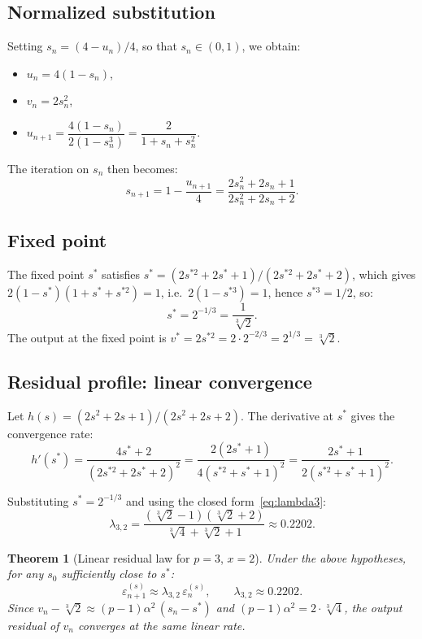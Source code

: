 \documentclass[10pt,a4paper,oneside]{book}
\newtheorem{theorem}{Theorem}[chapter]
\theoremstyle{definition}
\theoremstyle{remark}
\newcommand{\cbrt}[1]{\sqrt[3]{#1}}
\newcommand{\eps}{\varepsilon}
\begin{document}
\subsection{Normalized substitution}

Setting $s_n = (4 - u_n)/4$, so that $s_n \in (0,1)$, we obtain:
\begin{itemize}
  \item $u_n = 4(1 - s_n)$,
  \item $v_n = 2s_n^2$,
  \item $u_{n+1} = \dfrac{4(1-s_n)}{2(1-s_n^3)} = \dfrac{2}{1 + s_n + s_n^2}$.
\end{itemize}

The iteration on $s_n$ then becomes:
\begin{equation}
  \label{eq:iter_s3}
  s_{n+1} = 1 - \frac{u_{n+1}}{4} = \frac{2s_n^2 + 2s_n + 1}{2s_n^2 + 2s_n + 2}.
\end{equation}

\subsection{Fixed point}

The fixed point $s^*$ satisfies $s^* = (2s^{*2} + 2s^* + 1)/(2s^{*2} + 2s^* + 2)$, which gives $2(1-s^*)(1+s^*+s^{*2}) = 1$, i.e.\ $2(1-s^{*3}) = 1$, hence $s^{*3} = 1/2$, so:
\[
  s^* = 2^{-1/3} = \frac{1}{\cbrt{2}}.
\]
The output at the fixed point is $v^* = 2s^{*2} = 2 \cdot 2^{-2/3} = 2^{1/3} = \cbrt{2}$. \checkmark

\subsection{Residual profile: linear convergence}

Let $h(s) = (2s^2 + 2s + 1)/(2s^2 + 2s + 2)$. The derivative at $s^*$ gives the convergence rate:
\[
  h'(s^*) = \frac{4s^* + 2}{(2s^{*2} + 2s^* + 2)^2} = \frac{2(2s^*+1)}{4(s^{*2}+s^*+1)^2} = \frac{2s^*+1}{2(s^{*2}+s^*+1)^2}.
\]

Substituting $s^* = 2^{-1/3}$ and using the closed form~\eqref{eq:lambda3}:
\[
  \lambda_{3,2} = \frac{(\cbrt{2}-1)(\cbrt{2}+2)}{\cbrt{4}+\cbrt{2}+1} \approx 0.2202.
\]

\begin{theorem}[Linear residual law for $p=3$, $x=2$]
Under the above hypotheses, for any $s_0$ sufficiently close to $s^*$:
\[
  \eps_{n+1}^{(s)} \approx \lambda_{3,2}\,\eps_n^{(s)}, \qquad \lambda_{3,2} \approx 0.2202.
\]
Since $v_n - \cbrt{2} \approx (p-1)\alpha^2\,(s_n - s^*)$ and $(p-1)\alpha^2 = 2 \cdot \cbrt{4}$, the output residual of $v_n$ converges at the same linear rate.
\end{theorem}
\end{document}
